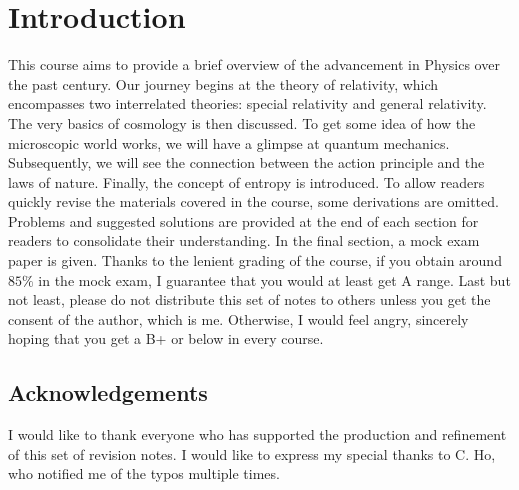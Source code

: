 \documentclass[12pt]{book} %
\numberwithin{equation}{chapter}
\begin{document}
\chapter*{Introduction}
This course aims to provide a brief overview of the advancement in Physics over the past century. Our journey begins at the theory of relativity, which encompasses two interrelated theories: special relativity and general relativity. The very basics of cosmology is then discussed. To get some idea of how the microscopic world works, we will have a glimpse at quantum mechanics. Subsequently, we will see the connection between the action principle and the laws of nature. Finally, the concept of entropy is introduced.\bigskip\newline
To allow readers quickly revise the materials covered in the course, some derivations are omitted. Problems and suggested solutions are provided at the end of each section for readers to consolidate their understanding. In the final section, a mock exam paper is given. Thanks to the lenient grading of the course, if you obtain around $85\%$ in the mock exam, I guarantee that you would at least get A range.\bigskip\newline
Last but not least, please do not distribute this set of notes to others unless you get the consent of the author, which is me. Otherwise, I would feel angry, sincerely hoping that you get a B+ or below in every course.

\section*{Acknowledgements}
I would like to thank everyone who has supported the production and refinement of this set of revision notes. I would like to express my special thanks to C. Ho, who notified me of the typos multiple times.

\end{document}
